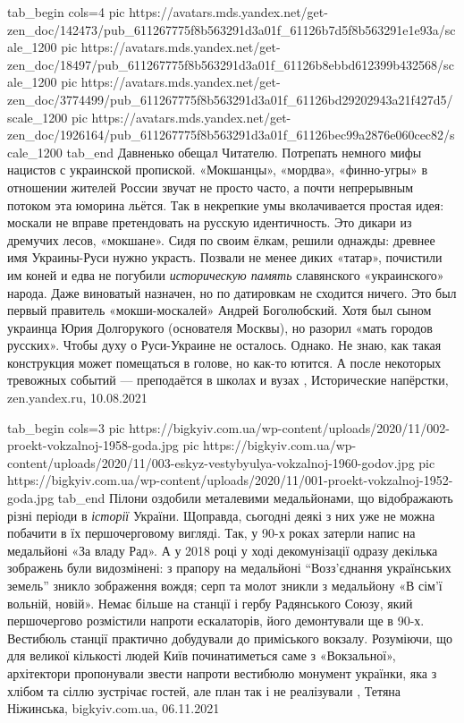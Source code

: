 \ifcmt
  tab_begin cols=4
     pic https://avatars.mds.yandex.net/get-zen_doc/142473/pub_611267775f8b563291d3a01f_61126b7d5f8b563291e1e93a/scale_1200
     pic https://avatars.mds.yandex.net/get-zen_doc/18497/pub_611267775f8b563291d3a01f_61126b8ebbd612399b432568/scale_1200
		 pic https://avatars.mds.yandex.net/get-zen_doc/3774499/pub_611267775f8b563291d3a01f_61126bd29202943a21f427d5/scale_1200
		 pic https://avatars.mds.yandex.net/get-zen_doc/1926164/pub_611267775f8b563291d3a01f_61126bec99a2876e060cec82/scale_1200
  tab_end
\fi
Давненько обещал Читателю. Потрепать немного мифы нацистов с украинской
пропиской. «Мокшанцы», «мордва», «финно-угры» в отношении жителей России звучат
не просто часто, а почти непрерывным потоком эта юморина льётся. Так в
некрепкие умы вколачивается простая идея: москали не вправе претендовать на
русскую идентичность. Это дикари из дремучих лесов, «мокшане».  Сидя по своим
ёлкам, решили однажды: древнее имя Украины-Руси нужно украсть.  Позвали не
менее диких «татар», почистили им коней и едва не погубили \emph{историческую
память} славянского «украинского» народа.  Даже виноватый назначен, но по
датировкам не сходится ничего. Это был первый правитель «мокши-москалей» Андрей
Боголюбский. Хотя был сыном украинца Юрия Долгорукого (основателя Москвы), но
разорил «мать городов русских». Чтобы духу о Руси-Украине не осталось. Однако.
Не знаю, как такая конструкция может помещаться в голове, но как-то ютится. А
после некоторых тревожных событий — преподаётся в школах и вузах
, 
Исторические напёрстки, zen.yandex.ru, 10.08.2021

\ifcmt
  tab_begin cols=3
     pic https://bigkyiv.com.ua/wp-content/uploads/2020/11/002-proekt-vokzalnoj-1958-goda.jpg
     pic https://bigkyiv.com.ua/wp-content/uploads/2020/11/003-eskyz-vestybyulya-vokzalnoj-1960-godov.jpg
		 pic https://bigkyiv.com.ua/wp-content/uploads/2020/11/001-proekt-vokzalnoj-1952-goda.jpg
  tab_end
\fi
Пілони оздобили металевими медальйонами, що відображають різні періоди в
\emph{історії} України. Щоправда, сьогодні деякі з них уже не можна побачити в їх
першочерговому вигляді.  Так, у 90-х роках затерли напис на медальйоні «За
владу Рад». А у 2018 році у ході декомунізації одразу декілька зображень були
видозмінені: з прапору на медальйоні \enquote{Возз’єднання українських земель} зникло
зображення вождя; серп та молот зникли з медальйону «В сім’ї вольній, новій».
Немає більше на станції і гербу Радянського Союзу, який першочергово розмістили
напроти ескалаторів, його демонтували ще в 90-х. Вестибюль станції практично
добудували до приміського вокзалу. Розуміючи, що для великої кількості людей
Київ починатиметься саме з «Вокзальної», архітектори пропонували звести напроти
вестибюлю монумент українки, яка з хлібом та сіллю зустрічає гостей, але план
так і не реалізували
, 
Тетяна Ніжинська, bigkyiv.com.ua, 06.11.2021
